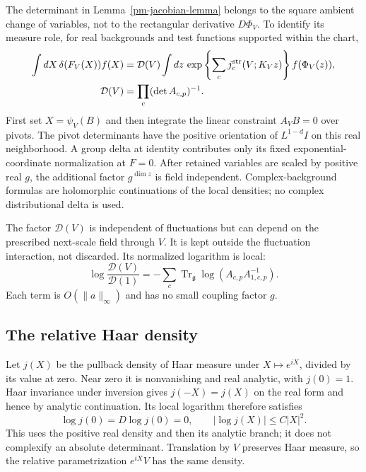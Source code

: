 The determinant in Lemma~\ref{pm-jacobian-lemma} belongs to
the square ambient change of variables, not to the rectangular
derivative $D\Phi_V$. To identify its measure role, for real
backgrounds and test functions supported within the chart,
\begin{equation}\label{pm-delta-reduction}
 \begin{split}
 \int dX\,\delta(F_V(X))f(X)
 &=\mathcal D(V)\int dz\,
 \exp\left\{\sum_cj_c^{\rm str}(V;K_Vz)\right\}
 f(\Phi_V(z)),\\
 \mathcal D(V)&=\prod_c(\det A_{c,p})^{-1}.
 \end{split}
\end{equation}
First set $X=\psi_V(B)$ and then integrate the linear
constraint $A_VB=0$ over pivots. The pivot determinants have
the positive orientation of $L^{1-d}I$ on this real
neighborhood. A group delta at identity contributes only its
fixed exponential-coordinate normalization at $F=0$.
After retained variables are scaled by positive real $g$,
the additional factor $g^{\dim z}$ is field independent.
Complex-background formulas are holomorphic continuations
of the local densities; no complex distributional delta is used.

The factor $\mathcal D(V)$ is independent of fluctuations
but can depend on the prescribed next-scale field through $V$.
It is kept outside the fluctuation interaction, not discarded.
Its normalized logarithm is local:
\begin{equation}\label{pm-background-determinant}
 \log\frac{\mathcal D(V)}{\mathcal D(1)}
 =-\sum_c\operatorname{Tr}_{\mathfrak g}
       \log(A_{c,p}A_{1,c,p}^{-1}).
\end{equation}
Each term is $O(\|a\|_\infty)$ and has no small coupling
factor $g$.

\subsection{The relative Haar density}
\label{pm-haar-section}

Let $j(X)$ be the pullback density of Haar measure under
$X\mapsto e^{iX}$, divided by its value at zero. Near zero
it is nonvanishing and real analytic, with $j(0)=1$.
Haar invariance under inversion gives $j(-X)=j(X)$ on
the real form and hence by analytic continuation. Its local
logarithm therefore satisfies
\begin{equation}\label{pm-haar-even}
 \log j(0)=D\log j(0)=0,\qquad |\log j(X)|\le C|X|^2.
\end{equation}
This uses the positive real density and then its analytic
branch; it does not complexify an absolute determinant.
Translation by $V$ preserves Haar measure, so the relative
parametrization $e^{iX}V$ has the same density.

